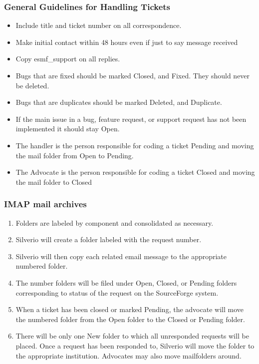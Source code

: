 \subsubsection{General Guidelines for Handling Tickets}
\begin{itemize}
\item Include title and ticket number on all correspondence.
\item Make initial contact within 48 hours even if just to say message received
\item Copy esmf\_support on all replies.
\item Bugs that are fixed should be marked Closed, and Fixed. They should never be deleted. 
\item Bugs that are duplicates should be marked Deleted, and Duplicate. 
\item If the main issue in a bug, feature request, or support request has not been implemented it should stay Open.
\item The handler is the person responsible for coding a ticket Pending and moving the mail folder from Open to Pending.
\item The Advocate is the person responsible for coding a ticket Closed and moving the mail folder to Closed
\end{itemize}

\subsubsection{IMAP mail archives}
\begin{enumerate}
\item Folders are labeled by component and consolidated as necessary.
\item Silverio will create a folder labeled with the request number. 
\item Silverio will then copy each related email message to the appropriate 
numbered folder. 
\item The number folders will be filed under Open, Closed, or Pending folders 
corresponding to status of the request on the SourceForge system.
\item When a ticket has been closed or marked Pending, the advocate will move the numbered folder from the Open folder to the Closed or Pending folder.
\item There will be only one New folder to which all unresponded requests will be placed. Once a request has been responded to, Silverio will move the folder to the appropriate institution. Advocates may also move mailfolders around.
\end{enumerate}